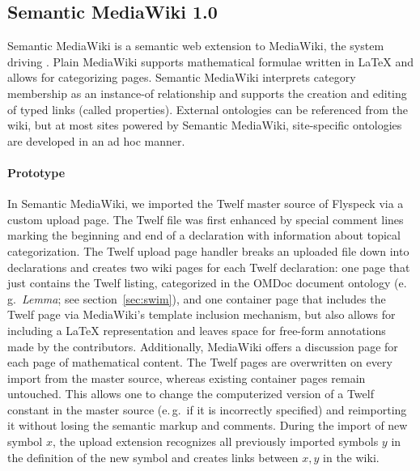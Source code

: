 \subsection{Semantic MediaWiki 1.0}
\label{sec:smw-study}

Semantic MediaWiki\cite{KrSchVr:semwiki-reasoning07} is a semantic web extension
to MediaWiki, the system driving .  Plain MediaWiki supports
mathematical formulae written in {\LaTeX} and allows for categorizing pages.
Semantic MediaWiki interprets category membership as an instance-of relationship
and supports the creation and editing of typed links (called properties).
External ontologies can be referenced from the wiki, but at most sites powered
by Semantic MediaWiki, site-specific ontologies are developed in an ad hoc
manner\cite{ontoworld:sites-using-smw}.

\paragraph{Prototype} In Semantic MediaWiki, we imported the Twelf master source
of Flyspeck via a custom upload page.  The Twelf file was first
enhanced by special comment lines marking the beginning and end of a
declaration with information about topical categorization.  The Twelf
upload page handler breaks an uploaded file down into declarations and
creates two wiki pages for each Twelf declaration: one page that just
contains the Twelf listing, categorized in the OMDoc document ontology
(e.\,g.\ \textit{Lemma}; see section~\ref{sec:swim}), and one
container page that includes the Twelf page via MediaWiki's template
inclusion mechanism, but also allows for including a {\LaTeX}
representation and leaves space for free-form annotations made by the
contributors.  Additionally, MediaWiki offers a discussion page for
each page of mathematical content.  The Twelf pages are overwritten on
every import from the master source, whereas existing container pages
remain untouched.  This allows one to change the computerized version
of a Twelf constant in the master source (e.\,g.\ if it is incorrectly
specified) and reimporting it without losing the semantic markup and
comments.  During the import of new symbol $x$, the upload extension
recognizes all previously imported symbols $y$ in the definition of
the new symbol and creates links between $x,y$ in the wiki.

